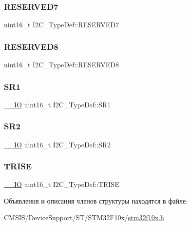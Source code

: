 \subsubsection{\texorpdfstring{RESERVED7}{RESERVED7}}
{\footnotesize\ttfamily uint16\+\_\+t I2\+C\+\_\+\+Type\+Def\+::\+R\+E\+S\+E\+R\+V\+E\+D7}

\mbox{\label{struct_i2_c___type_def_a6e762751c9d5a1e41efb6033a26d8ed8}} 
\subsubsection{\texorpdfstring{RESERVED8}{RESERVED8}}
{\footnotesize\ttfamily uint16\+\_\+t I2\+C\+\_\+\+Type\+Def\+::\+R\+E\+S\+E\+R\+V\+E\+D8}

\mbox{\label{struct_i2_c___type_def_ae1602cd1c9cad449523099c97138f991}} 
\subsubsection{\texorpdfstring{SR1}{SR1}}
{\footnotesize\ttfamily \mbox{\hyperlink{group___c_m_s_i_s___c_m3__core__definitions_gaec43007d9998a0a0e01faede4133d6be}{\+\_\+\+\_\+\+IO}} uint16\+\_\+t I2\+C\+\_\+\+Type\+Def\+::\+S\+R1}

\mbox{\label{struct_i2_c___type_def_a95c7f729b10eb2acafe499d9c9a81a83}} 
\subsubsection{\texorpdfstring{SR2}{SR2}}
{\footnotesize\ttfamily \mbox{\hyperlink{group___c_m_s_i_s___c_m3__core__definitions_gaec43007d9998a0a0e01faede4133d6be}{\+\_\+\+\_\+\+IO}} uint16\+\_\+t I2\+C\+\_\+\+Type\+Def\+::\+S\+R2}

\mbox{\label{struct_i2_c___type_def_aaba7a808e4dfae5cc06b197c298af206}} 
\subsubsection{\texorpdfstring{TRISE}{TRISE}}
{\footnotesize\ttfamily \mbox{\hyperlink{group___c_m_s_i_s___c_m3__core__definitions_gaec43007d9998a0a0e01faede4133d6be}{\+\_\+\+\_\+\+IO}} uint16\+\_\+t I2\+C\+\_\+\+Type\+Def\+::\+T\+R\+I\+SE}



Объявления и описания членов структуры находятся в файле\+:\begin{DoxyCompactItemize}
\item 
C\+M\+S\+I\+S/\+Device\+Support/\+S\+T/\+S\+T\+M32\+F10x/\mbox{\hyperlink{stm32f10x_8h}{stm32f10x.\+h}}\end{DoxyCompactItemize}
